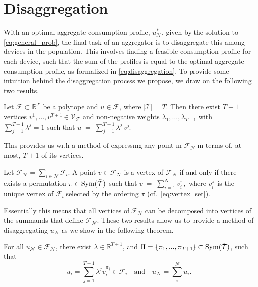 
\section{Disaggregation}\label{sec:disaggregation}


With an optimal aggregate consumption profile, $u^*_\mathcal{N}$, given by the solution to \eqref{eq:general_prob}, the final task of an aggregator is to disaggregate this among devices in the population. This involves finding a feasible consumption profile for each device, such that 
the sum of the profiles is equal to the optimal aggregate consumption profile, as formalized in \eqref{eq:disaggregation}. To provide some intuition behind the disaggregation process we propose, we draw on the following two results.
\begin{theorem}\cite[Proposition 1.15]{Ziegler2012LecturesPolytopes}\label{thm:caratheodory}
Let \(\mathcal{F}\subset\mathbb{R}^{\mathcal{T}}\) be a polytope and \(u\in\mathcal{F}\), where $|\mathcal{T}| = T$.  Then there exist \(T+1\) vertices \(v^1,\dots,v^{T+1}\in\mathcal{V}_{\mathcal{F}}\) and non-negative weights \(\lambda_1,\dots,\lambda_{T+1}\) with \(\sum_{j=1}^{T+1}\lambda^j=1\) such that $u \;=\;\sum_{j=1}^{T+1}\lambda^j\,v^j$.
\end{theorem}
\noindent
This provides us with a method of expressing any point in $\mathcal{F}_\mathcal{N}$ in terms of, at most, $T+1$ of its vertices.
\begin{corollary}\cite[Corollary 2.2]{Fukuda2004FromPolytopes}\label{thm:fukuda}
Let \(\mathcal{F}_{\mathcal{N}}=\sum_{i\in \mathcal{N}}\mathcal{F}_i\).  A point \(v\in\mathcal{F}_{\mathcal{N}}\) is a vertex of \(\mathcal{F}_{\mathcal{N}}\) if and only if there exists a permutation \(\pi\in\mathrm{Sym}(\Tilde{\mathcal{T}})\) such that $ v \;=\;\sum_{i=1}^N v_i^\pi,$ where \(v_i^\pi\) is the unique vertex of \(\mathcal{F}_i\) selected by the ordering \(\pi\) (cf.\ \eqref{eq:vertex_set}).
\end{corollary}
\noindent
Essentially this means that all vertices of $\mathcal{F}_\mathcal{N}$ can be decomposed into vertices of the summands that define $\mathcal{F}_\mathcal{N}$. These two results allow us to provide a method of disaggregating $u_\mathcal{N}$ as we show in the following theorem.
\begin{theorem}[Disaggregation]\label{thm:disaggregation}
    For all $u_\mathcal{N} \in \mathcal{F}_\mathcal{N}$, there exist $\lambda \in \mathbb{R}^{T + 1}$, and $\Pi = \{\pi_1, ..., \pi_{T+1}\} \subset \mathrm{Sym}(\Tilde{\mathcal{T}})$, such that
    \begin{equation}
        u_i = \sum_{j=1}^{T+1} \lambda^j v_i^{\pi_j} \in \mathcal{F}_i \quad \textrm{and} \quad
        u_\mathcal{N} = \sum_i^N u_i.
    \end{equation}
\end{theorem}
